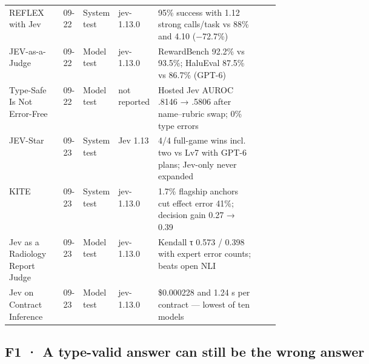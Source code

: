 \begin{table}[tbp]
\begin{tabularx}{\linewidth}{p{0.2\linewidth}p{0.055\linewidth}p{0.085\linewidth}p{0.11\linewidth}Xp{0.075\linewidth}}
REFLEX with Jev & 09-22 & System test & jev-1.13.0 & 95\% success with 1.12 strong calls/task vs 88\% and 4.10 (−72.7\%) & \citep{arxiv2609_26532} \\
JEV-as-a-Judge & 09-22 & Model test & jev-1.13.0 & RewardBench 92.2\% vs 93.5\%; HaluEval 87.5\% vs 86.7\% (GPT-6) & \citep{arxiv2609_26550} \\
Type-Safe Is Not Error-Free & 09-22 & Model test & not reported & Hosted Jev AUROC .8146 → .5806 after name–rubric swap; 0\% type errors & \citep{arxiv2609_26758} \\
JEV-Star & 09-23 & System test & Jev 1.13 & 4/4 full-game wins incl. two vs Lv7 with GPT-6 plans; Jev-only never expanded & \citep{arxiv2609_27331} \\
KITE & 09-23 & System test & jev-1.13.0 & 1.7\% flagship anchors cut effect error 41\%; decision gain 0.27 → 0.39 & \citep{arxiv2609_27535} \\
Jev as a Radiology Report Judge & 09-23 & Model test & jev-1.13.0 & Kendall τ 0.573 / 0.398 with expert error counts; beats open NLI & \citep{arxiv2609_27607} \\
Jev on Contract Inference & 09-23 & Model test & jev-1.13.0 & \$0.000228 and 1.24 s per contract — lowest of ten models & \citep{arxiv2609_27678} \\
\bottomrule
\end{tabularx}
\end{table}

\subsection{F1 · A type-valid answer can still be the wrong answer}


